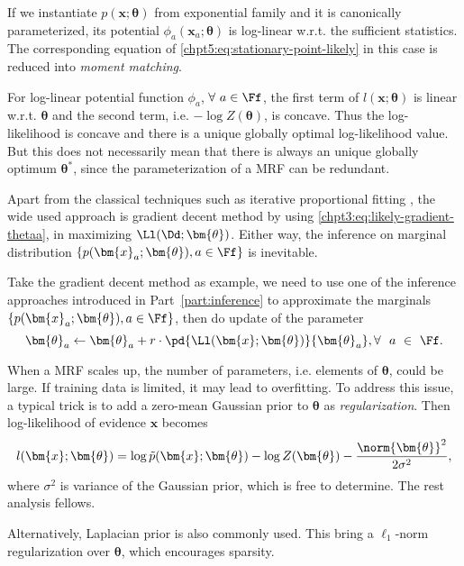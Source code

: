 \begin{remark}
  If we instantiate $p(\bm{x};\bm{\theta})$ from exponential family and it is canonically parameterized, its potential $\phi_a(\bm{x}_a; \bm{\theta})$ is log-linear w.r.t. the sufficient statistics. The corresponding equation of \eqref{chpt5:eq:stationary-point-likely} in this case is reduced into \textit{moment matching}.

  {For log-linear potential function $\phi_a$, $\forall ~a \in \Ff$, the first term of $l(\bm{x}; \bm{\theta})$ is linear w.r.t. $\bm{\theta}$ and the second term, i.e. $-\log{Z(\bm{\theta})}$, is concave. Thus the log-likelihood is concave and there is a unique globally optimal log-likelihood value. But this does not necessarily mean that there is always an unique globally optimum $\bm{\theta}^{\ast}$, since the parameterization of a MRF can be redundant.}
  
\end{remark}

Apart from the classical techniques such as iterative proportional fitting \cite[section~6.1]{wainwright2008graphical}\cite{eric10-708ipf}, the wide used approach is gradient decent method by using \eqref{chpt3:eq:likely-gradient-thetaa}, in maximizing $\Ll(\Dd; \bm{\theta})$. Either way, the inference on marginal distribution $\left\{ p(\bm{x}_a; \bm{\theta}), a \in \Ff \right\}$ is inevitable.

Take the gradient decent method as example, we need to use one of the inference approaches introduced in Part~\ref{part:inference} to approximate the marginals $\left\{ p(\bm{x}_a; \bm{\theta}), a \in \Ff \right\}$, then do update of the parameter
\begin{equation}
  \bm{\theta}_a \leftarrow \bm{\theta}_a + r \cdot \pd{\Ll(\bm{x};\bm{\theta})}{\bm{\theta}_a}, \forall~~a~\in~\Ff.
\end{equation}

\begin{remark}
  When a MRF scales up, the number of parameters, i.e. elements of $\bm{\theta}$, could be large. If training data is limited, it may lead to overfitting. To address this issue, a typical trick is to add a zero-mean Gaussian prior to $\bm{\theta}$ as \textit{regularization}. Then log-likelihood of evidence $\bm{x}$ becomes 
  \begin{equation}
    l(\bm{x};\bm{\theta}) = \log{\tilde{p}(\bm{x}; \bm{\theta})} - \log{Z(\bm{\theta})} - \frac{\norm{\bm{\theta}}^2}{2\sigma^2},
  \end{equation}
  where $\sigma^2$ is variance of the Gaussian prior, which is free to determine. The rest analysis fellows.

  {Alternatively, Laplacian prior is also commonly used. This bring a $\ell_1$-norm regularization over $\bm{\theta}$, which encourages sparsity.}

\end{remark}


